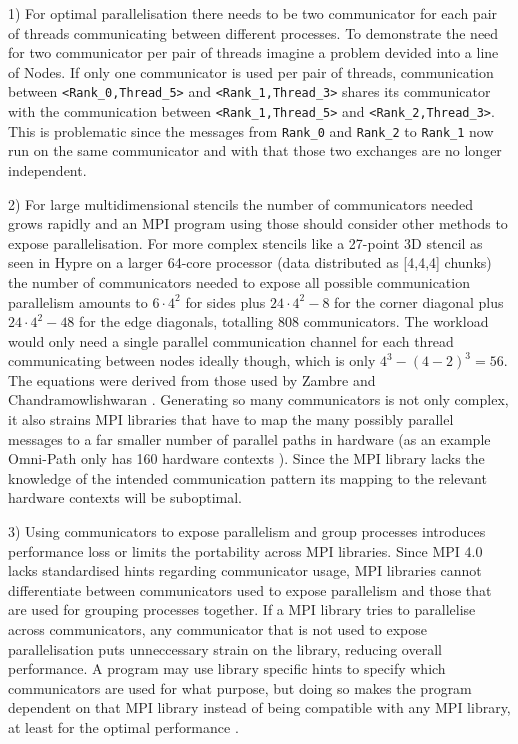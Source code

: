 \documentclass[sigconf]{acmart}
\begin{document}
1) For optimal parallelisation there needs to be two communicator for each pair of threads communicating between different processes.
To demonstrate the need for two communicator per pair of threads imagine a problem devided into a line of Nodes.
If only one communicator is used per pair of threads, communication between \verb|<Rank_0,Thread_5>| and \verb|<Rank_1,Thread_3>| shares its communicator with the communication between \verb|<Rank_1,Thread_5>| and \verb|<Rank_2,Thread_3>|.
This is problematic since the messages from \verb|Rank_0| and \verb|Rank_2| to \verb|Rank_1| now run on the same communicator and with that those two exchanges are no longer independent.

2) For large multidimensional stencils the number of communicators needed grows rapidly and an MPI program using those should consider other methods to expose parallelisation.
For more complex stencils like a 27-point 3D stencil as seen in Hypre\cite{hypre2020} on a larger 64-core processor (data distributed as [4,4,4] chunks) the number of communicators needed to expose all possible communication parallelism amounts to $6 \cdot 4^2$ for sides plus $24 \cdot 4^2 - 8$ for the corner diagonal plus $24 \cdot 4^2 - 48$ for the edge diagonals, totalling $808$ communicators.
The workload would only need a single parallel communication channel for each thread communicating between nodes ideally though, which is only $4^3 - (4-2)^3 = 56$.
The equations were derived from those used by Zambre and Chandramowlishwaran \cite{zambreLessonsLearned2022}.
Generating so many communicators is not only complex, it also strains MPI libraries that have to map the many possibly parallel messages to a far smaller number of parallel paths in hardware (as an example Omni-Path only has 160 hardware contexts \cite{intelOmniPath}).
Since the MPI library lacks the knowledge of the intended communication pattern its mapping to the relevant hardware contexts will be suboptimal.

3) Using communicators to expose parallelism and group processes introduces performance loss or limits the portability across MPI libraries.
Since MPI 4.0 lacks standardised hints regarding communicator usage, MPI libraries cannot differentiate between communicators used to expose parallelism and those that are used for grouping processes together.
If a MPI library tries to parallelise across communicators, any communicator that is not used to expose parallelisation puts unneccessary strain on the library, reducing overall performance.
A program may use library specific hints to specify which communicators are used for what purpose, but doing so makes the program dependent on that MPI library instead of being compatible with any MPI library, at least for the optimal performance \cite{zambreLessonsLearned2022}.
\end{document}
